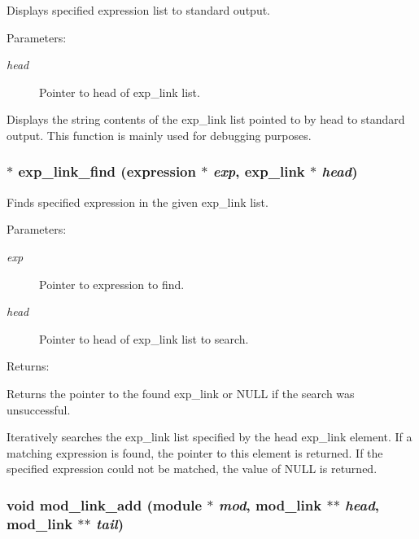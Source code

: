 Displays specified expression list to standard output.

\begin{Desc}
\item[Parameters: ]\par
\begin{description}
\item[{\em 
head}]Pointer to head of exp\_\-link list.\end{description}
\end{Desc}
Displays the string contents of the exp\_\-link list pointed to by head to standard output. This function is mainly used for debugging purposes. 
\subsubsection{$\ast$ exp\_\-link\_\-find ({\bf expression} $\ast$ {\em exp}, {\bf exp\_\-link} $\ast$ {\em head})}\label{link_8c_a9}


Finds specified expression in the given exp\_\-link list.

\begin{Desc}
\item[Parameters: ]\par
\begin{description}
\item[{\em 
exp}]Pointer to expression to find. \item[{\em 
head}]Pointer to head of exp\_\-link list to search. \end{description}
\end{Desc}
\begin{Desc}
\item[Returns: ]\par
Returns the pointer to the found exp\_\-link or NULL if the search was unsuccessful.\end{Desc}
Iteratively searches the exp\_\-link list specified by the head exp\_\-link element. If a matching expression is found, the pointer to this element is returned. If the specified expression could not be matched, the value of NULL is returned. 
\subsubsection{\setlength{\rightskip}{0pt plus 5cm}void mod\_\-link\_\-add ({\bf module} $\ast$ {\em mod}, {\bf mod\_\-link} $\ast$$\ast$ {\em head}, {\bf mod\_\-link} $\ast$$\ast$ {\em tail})}\label{link_8c_a3}


